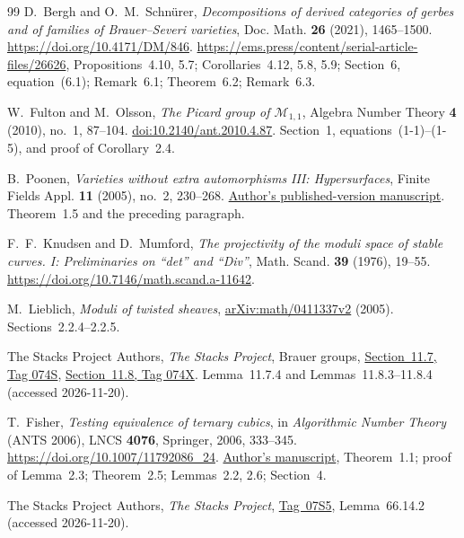 \begin{thebibliography}{99}
D.~Bergh and O.~M.~Schn\"urer,
\emph{Decompositions of derived categories of gerbes
and of families of Brauer--Severi varieties},
Doc. Math. \textbf{26} (2021), 1465--1500.
\url{https://doi.org/10.4171/DM/846}.
\url{https://ems.press/content/serial-article-files/26626},
Propositions~4.10, 5.7; Corollaries~4.12, 5.8, 5.9; Section~6, equation~(6.1); Remark~6.1; Theorem~6.2; Remark~6.3.

W.~Fulton and M.~Olsson,
\emph{The Picard group of $\mathcal M_{1,1}$},
Algebra Number Theory \textbf{4} (2010), no.~1, 87--104.
\href{https://doi.org/10.2140/ant.2010.4.87}{doi:10.2140/ant.2010.4.87}.
Section~1, equations~(1-1)--(1-5), and proof of Corollary~2.4.

B.~Poonen,
\emph{Varieties without extra automorphisms III: Hypersurfaces},
Finite Fields Appl. \textbf{11} (2005), no.~2, 230--268.
\href{https://math.mit.edu/~poonen/papers/projaut.pdf}{Author's published-version manuscript}.
Theorem~1.5 and the preceding paragraph.

F.~F.~Knudsen and D.~Mumford,
\emph{The projectivity of the moduli space of stable curves. I:
Preliminaries on ``det'' and ``Div''},
Math. Scand. \textbf{39} (1976), 19--55.
\url{https://doi.org/10.7146/math.scand.a-11642}.

M.~Lieblich,
\emph{Moduli of twisted sheaves},
\href{https://arxiv.org/abs/math/0411337v2}{arXiv:math/0411337v2} (2005).
Sections~2.2.4--2.2.5.

The Stacks Project Authors,
\emph{The Stacks Project}, Brauer groups,
\href{https://stacks.math.columbia.edu/tag/074S}{Section~11.7, Tag 074S},
\href{https://stacks.math.columbia.edu/tag/074X}{Section~11.8, Tag 074X}.
Lemma~11.7.4 and Lemmas~11.8.3--11.8.4 (accessed 2026-11-20).


T.~Fisher,
\emph{Testing equivalence of ternary cubics},
in \emph{Algorithmic Number Theory} (ANTS 2006),
LNCS \textbf{4076},
Springer, 2006, 333--345.
\url{https://doi.org/10.1007/11792086_24}.
\href{https://www.dpmms.cam.ac.uk/~taf1000/papers/testeqtc.pdf}{Author's manuscript},
Theorem~1.1; proof of Lemma~2.3; Theorem~2.5; Lemmas~2.2, 2.6; Section~4.

The Stacks Project Authors,
\emph{The Stacks Project},
\href{https://stacks.math.columbia.edu/tag/07S5}{Tag~07S5},
Lemma~66.14.2 (accessed 2026-11-20).


\end{thebibliography}

